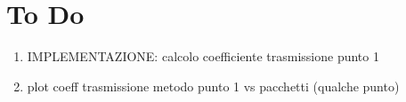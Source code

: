 \section*{To Do}
\begin{enumerate}
\item IMPLEMENTAZIONE: calcolo coefficiente trasmissione punto 1

\item plot coeff trasmissione metodo punto 1 vs pacchetti (qualche punto)
\end{enumerate}
\newpage

